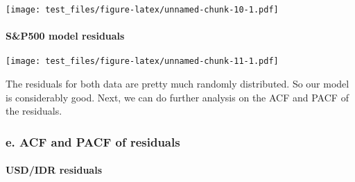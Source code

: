 \documentclass[]{article}
\newenvironment{Shaded}{\begin{snugshade}}{\end{snugshade}}
\newcommand{\KeywordTok}[1]{\textcolor[rgb]{0.13,0.29,0.53}{\textbf{#1}}}
\newcommand{\DataTypeTok}[1]{\textcolor[rgb]{0.13,0.29,0.53}{#1}}
\newcommand{\StringTok}[1]{\textcolor[rgb]{0.31,0.60,0.02}{#1}}
\newcommand{\OperatorTok}[1]{\textcolor[rgb]{0.81,0.36,0.00}{\textbf{#1}}}
\newcommand{\NormalTok}[1]{#1}
\let\oldparagraph\paragraph
\renewcommand{\paragraph}[1]{\oldparagraph{#1}\mbox{}}
\begin{document}
\begin{Shaded}
\end{Shaded}

\texttt{[image: test\_files/figure-latex/unnamed-chunk-10-1.pdf]}

\paragraph{S\&P500 model residuals}\label{sp500-model-residuals}

\begin{Shaded}
\end{Shaded}

\texttt{[image: test\_files/figure-latex/unnamed-chunk-11-1.pdf]}

The residuals for both data are pretty much randomly distributed. So our
model is considerably good. Next, we can do further analysis on the ACF
and PACF of the residuals.

\subsubsection{e. ACF and PACF of
residuals}\label{e.-acf-and-pacf-of-residuals}

\paragraph{USD/IDR residuals}\label{usdidr-residuals}
\end{document}
